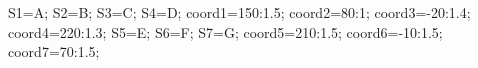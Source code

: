 \documentclass[exercice]{thedocument}%
\begin{document}
%
    \>S1=A;%
    \>S2=B;%
    \>S3=C;%
    \>S4=D;%
    \>coord1={150:1.5};%
    \>coord2={80:1};%
    \>coord3={-20:1.4};%
    \>coord4={220:1.3};%
    \>S5=E;%
    \>S6=F;%
    \>S7=G;%
    \>coord5={210:1.5};%
    \>coord6={-10:1.5};%
    \>coord7={70:1.5};%
\end{document}
